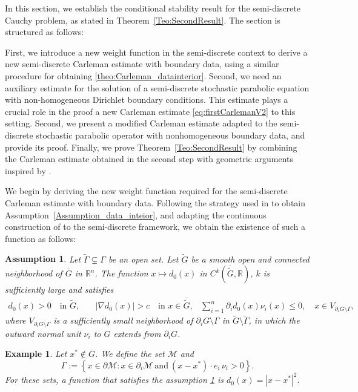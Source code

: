\documentclass[11pt,oneside,leqno]{amsart}
\numberwithin{equation}{section}
\numberwithin{equation}{section}
\newtheorem{assumption}[theorem]{Assumption}
\newtheorem{example}[theorem]{Example}
\begin{document}
In this section, we establish the conditional stability result for the semi-discrete Cauchy problem, as stated in Theorem~\ref{Teo:SecondResult}. The section is structured as follows: { First, we introduce a new weight function in the semi-discrete context to derive a new semi-discrete Carleman estimate with boundary data, using a similar procedure for obtaining \eqref{theo:Carleman_datainterior}. Second, we need an auxiliary estimate for the solution of a semi-discrete stochastic parabolic equation with non-homogeneous Dirichlet boundary conditions. This estimate plays a crucial role in the proof a new Carleman estimate \eqref{eq:firstCarlemanV2} to this setting. Second, we present a modified Carleman estimate adapted to the semi-discrete stochastic parabolic operator with nonhomogeneous boundary data, and provide its proof. Finally, we prove Theorem~\ref{Teo:SecondResult} by combining the Carleman estimate obtained in the second step with geometric arguments inspired by \cite{Yamamoto_2009}.

We begin by deriving the new weight function required for the semi-discrete Carleman estimate with boundary data. Following the strategy used in \cite{BHLR:2010b} to obtain Assumption~\ref{Assumption_data_inteior}, and adapting the continuous construction of \cite[Lemma~1.2]{Emanuilov:1995} to the semi-discrete framework, we obtain the existence of such a function as follows:
\begin{assumption}\label{WFdataboundary}
Let $\tilde{\Gamma}\subsetneq\Gamma$ be an open set. Let $\tilde{G}$ be a smooth open and connected neighborhood of $\overline{G}$ in $\mathbb{R}^n$. The function $x\mapsto d_0(x)$ in $C^{k}(\overline{\tilde{G}},\mathbb{R})$, $k$ is sufficiently large and satisfies
\begin{equation*}
    \begin{array}{ccc}
         d_0(x)>0\quad \text{in}\,\, \tilde{G},&\quad |\nabla d_0(x)|>c\quad \text{in}\,\,x\in  \overline{\tilde{G}}, & \sum_{i=1}^{n} \partial_id_0(x) \nu_{i}(x)\leq 0, \quad x\in  V_{\partial_iG\setminus\Gamma},    
    \end{array}
\end{equation*}
where $V_{\partial_iG\setminus \Gamma}$ is a sufficiently small neighborhood of $\partial_iG\setminus \Gamma$ in $\tilde{G}\setminus \tilde{\Gamma}$, in which the outward normal unit $\nu_i$ to $G$ extends from $\partial_i G$.
\end{assumption}
\begin{example} Let $ x^{*} \notin \overline{G} $. We define the set $\mathcal{M}$ and  
\[
\Gamma := \left\{ x \in \partial \mathcal{M} : x \in \partial_i \mathcal{M} \ \text{and}\ (x - x^{*}) \cdot e_i\,\nu_i > 0 \right\}.
\]
For these sets, a function that satisfies the assumption \ref{WFdataboundary} is $d_0(x) = |x - x^{*}|^2.$


\end{example}}
\end{document}
